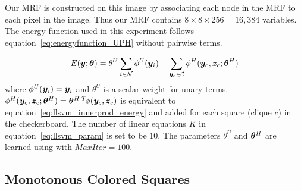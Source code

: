 Our MRF is constructed on this image by associating each node in
the MRF to each pixel in the image. Thus our MRF contains $8
\times 8 \times 256 = 16,384$ variables. The energy function used
in this experiment follows equation~\eqref{eq:energyfunction_UPH}
without pairwise terms.

\begin{align}
  \label{eq:syncheck_energy}
  E({\bm{y}};{\bm{\theta}})=\theta^U\sum_{i\in {\mathcal{N}}}{\phi^U({\bm{y}}_i)}+
  \sum_{{\bm{y}}_c\in {\mathcal{C}}}{\phi^H({\bm{y}}_c,{\bm{z}}_c;{\bm{\theta}}^H)}
\end{align}
where $\phi^U({\bm{y}}_i)={\bm{y}}_i$ and $\theta^U$ is a scalar weight for
unary terms. $\phi^H({\bm{y}}_c,{\bm{z}}_c;{\bm{\theta}}^H)={\bm{\theta}}^{H\;T} \!
\phi({\bm{y}}_c,{\bm{z}}_c)$ is equivalent to
equation~\eqref{eq:llsvm_innerprod_energy} and added for each
square (clique $c$) in the checkerboard. The number of linear
equations $K$ in equation~\eqref{eq:llsvm_param} is set to be
$10$. The parameters $\theta^U$ and ${\bm{\theta}}^H$ are learned using
 with $MaxIter=100$. 

\subsection{Monotonous Colored Squares}
\label{sec:monot-color-squar}

